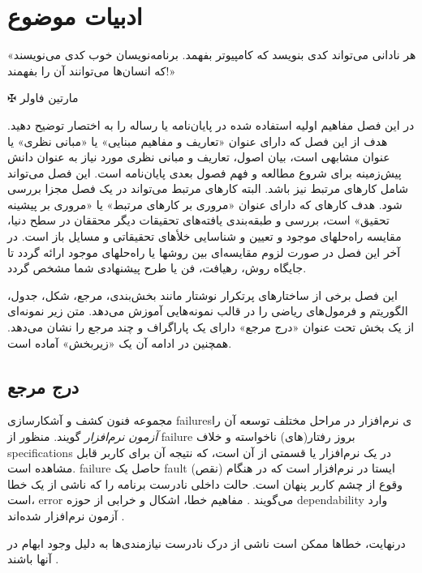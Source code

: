 
\chapter{ادبیات موضوع}\label{chapter:2}
\thispagestyle{empty}
\epigraph{
«هر نادانی می‌تواند کدی بنویسد که کامپیوتر بفهمد. برنامه‌نویسان خوب کدی می‌نویسند که انسان‌ها می‌توانند آن را بفهمند!»
}
{$ \maltese $ {\large مارتین فاولر}}
\noindent
در این فصل مفاهیم اولیه استفاده شده در پایان‌نامه یا رساله را به اختصار توضیح دهید.
 هدف از این فصل كه دارای عنوان «تعاریف و مفاهیم مبنایی» یا «مبانی نظری» یا عنوان مشابهی است، بیان اصول، تعاریف و مبانی نظری مورد نیاز به عنوان دانش پیش‌زمینه  برای شروع مطالعه و فهم فصول بعدی پایان‌نامه است.
 این فصل می‌تواند شامل کارهای مرتبط نیز باشد. البته کارهای مرتبط می‌تواند در یک فصل مجزا بررسی شود. هدف کارهای كه دارای عنوان «مروری بر کارهای مرتبط» یا «مروری بر پیشینه تحقیق» است، بررسی و طبقه‌بندی یافته‌های تحقیقات دیگر محققان در سطح دنیا، مقایسه راه‌حلهای موجود و تعیین و شناسایی خلأهای تحقیقاتی و مسایل باز  است. در آخر این فصل در صورت لزوم مقایسه‌ای بین روشها یا راه‌حلهای موجود ارائه گردد تا جایگاه روش، رهیافت، فن یا طرح پیشنهادی شما مشخص گردد.
 \par
 این فصل برخی از ساختارهای پرتکرار نوشتار مانند بخش‌بندی، مرجع، شکل، جدول، الگوریتم و فرمول‌های ریاضی را در قالب نمونه‌هایی آموزش می‌دهد.
متن زیر نمونه‌ای از یک بخش تحت عنوان «درج مرجع» دارای یک پاراگراف و چند مرجع را نشان می‌دهد.  همچنین در ادامه آن یک «زیربخش» آماده است. 
 
\section{درج مرجع}\label{software_testing}
مجموعه فنون کشف و آشکارسازی 
\glspl{failure}ی
 نرم‌افزار در مراحل مختلف توسعه آن را
\textit{آزمون نرم‌افزار}
گویند. منظور از 
\gls{failure}
 بروز رفتار(های) ناخواسته و خلاف
 \glspl{specification}
 در یک نرم‌افزار یا قسمتی از آن است، که نتیجه آن برای کاربر قابل مشاهده است.
 \gls{failure}
 حاصل یک
 \gls{fault}
  (نقص) ایستا در نرم‌افزار است که در هنگام وقوع از چشم کاربر پنهان است. حالت داخلی نادرست برنامه را که ناشی از یک خطا است،  
\gls{error} 
می‌گویند
\cite{ammann2016introduction}.
 مفاهیم خطا، اشکال و خرابی از حوزه
 \gls{dependability}
  وارد آزمون نرم‌افزار شده‌اند
\cite{Dubrova:2013:FD:2462571}.
\par
درنهایت، خطاها ممکن است ناشی از درک نادرست نیازمندی‌ها به دلیل وجود ابهام در آنها باشند
\cite{Ferrari2017}.

